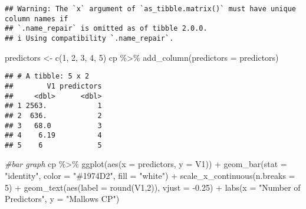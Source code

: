 \documentclass[
]{article}
\newenvironment{Shaded}{\begin{snugshade}}{\end{snugshade}}
\newcommand{\AttributeTok}[1]{\textcolor[rgb]{0.77,0.63,0.00}{#1}}
\newcommand{\CommentTok}[1]{\textcolor[rgb]{0.56,0.35,0.01}{\textit{#1}}}
\newcommand{\DecValTok}[1]{\textcolor[rgb]{0.00,0.00,0.81}{#1}}
\newcommand{\FloatTok}[1]{\textcolor[rgb]{0.00,0.00,0.81}{#1}}
\newcommand{\FunctionTok}[1]{\textcolor[rgb]{0.00,0.00,0.00}{#1}}
\newcommand{\NormalTok}[1]{#1}
\newcommand{\OtherTok}[1]{\textcolor[rgb]{0.56,0.35,0.01}{#1}}
\newcommand{\SpecialCharTok}[1]{\textcolor[rgb]{0.00,0.00,0.00}{#1}}
\newcommand{\StringTok}[1]{\textcolor[rgb]{0.31,0.60,0.02}{#1}}
\begin{document}
\begin{Shaded}
\end{Shaded}

\begin{verbatim}
## Warning: The `x` argument of `as_tibble.matrix()` must have unique column names if
## `.name_repair` is omitted as of tibble 2.0.0.
## i Using compatibility `.name_repair`.
\end{verbatim}

\begin{Shaded}
\begin{Highlighting}[]
\NormalTok{predictors }\OtherTok{\textless{}{-}} \FunctionTok{c}\NormalTok{(}\DecValTok{1}\NormalTok{, }\DecValTok{2}\NormalTok{, }\DecValTok{3}\NormalTok{, }\DecValTok{4}\NormalTok{, }\DecValTok{5}\NormalTok{)}
\NormalTok{cp }\SpecialCharTok{\%\textgreater{}\%} \FunctionTok{add\_column}\NormalTok{(}\AttributeTok{predictors =}\NormalTok{ predictors)}
\end{Highlighting}
\end{Shaded}

\begin{verbatim}
## # A tibble: 5 x 2
##        V1 predictors
##     <dbl>      <dbl>
## 1 2563.            1
## 2  636.            2
## 3   68.0           3
## 4    6.19          4
## 5    6             5
\end{verbatim}

\begin{Shaded}
\begin{Highlighting}[]
\CommentTok{\#bar graph}
\NormalTok{cp }\SpecialCharTok{\%\textgreater{}\%} \FunctionTok{ggplot}\NormalTok{(}\FunctionTok{aes}\NormalTok{(}\AttributeTok{x =}\NormalTok{ predictors, }\AttributeTok{y =}\NormalTok{ V1)) }\SpecialCharTok{+} 
  \FunctionTok{geom\_bar}\NormalTok{(}\AttributeTok{stat =} \StringTok{"identity"}\NormalTok{, }\AttributeTok{color =} \StringTok{"\#1974D2"}\NormalTok{, }\AttributeTok{fill =} \StringTok{"white"}\NormalTok{) }\SpecialCharTok{+} 
  \FunctionTok{scale\_x\_continuous}\NormalTok{(}\AttributeTok{n.breaks =} \DecValTok{5}\NormalTok{) }\SpecialCharTok{+}
  \FunctionTok{geom\_text}\NormalTok{(}\FunctionTok{aes}\NormalTok{(}\AttributeTok{label =} \FunctionTok{round}\NormalTok{(V1,}\DecValTok{2}\NormalTok{)), }\AttributeTok{vjust =} \SpecialCharTok{{-}}\FloatTok{0.25}\NormalTok{) }\SpecialCharTok{+}
  \FunctionTok{labs}\NormalTok{(}\AttributeTok{x =} \StringTok{"Number of Predictors"}\NormalTok{, }\AttributeTok{y =} \StringTok{"Mallow\textquotesingle{}s CP"}\NormalTok{)}
\end{Highlighting}
\end{Shaded}
\end{document}
